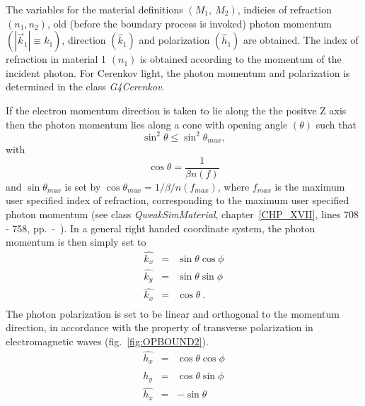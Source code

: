 The variables for the material definitions $(M_1,~M_2)$, indicies of
refraction $(n_1,n_2)$, old (before the boundary process is invoked)
photon momentum $(|\vec{k}_1| \equiv k_1)$, direction $(\hat{k}_1)$
and polarization $(\hat{h}_1)$ are obtained. The index of
refraction in material 1 $(n_1)$ is obtained according to the momentum
of the incident photon. For Cerenkov light, the photon momentum and
polarization is determined in the class {\em G4Cerenkov}.

If the electron momentum direction is taken to lie along the the
positve Z axis then the photon momentum lies along a cone with opening
angle $(\theta)$ such that $$\sin^2\theta \leq \sin^2\theta_{max},$$
with $$\cos\theta = \frac{1}{\beta n(f)}$$ and $\sin\theta_{max}$ is
set by $\cos\theta_{max} = 1/\beta/n(f_{max})$, where $f_{max}$ is the
maximum user specified index of refraction, corresponding to the
maximum user specified photon momentum (see class {\it
QweakSimMaterial}, chapter~\ref{CHP_XVII}, lines 708 - 758,
pp.~\pageref{SourceXVII12}-~\pageref{SourceXVII13}).  In a general
right handed coordinate system, the photon momentum is then simply set
to
\begin{eqnarray}
\hat{k_x} &=& \sin\theta\cos\phi \nonumber \\ 
\hat{k_y} &=& \sin\theta\sin\phi \nonumber \\ 
\hat{k_x} &=& \cos\theta~. \nonumber \\ \nonumber 
\end{eqnarray}
The photon polarization is set to be linear and orthogonal to the
momentum direction, in accordance with the property of transverse 
polarization in electromagnetic waves (fig.~\ref{fig:OPBOUND2}). 
\begin{eqnarray}
\hat{h_x} &=& \cos\theta\cos\phi \nonumber \\ 
\hat{h_y} &=& \cos\theta\sin\phi \nonumber \\ 
\hat{h_x} &=& -\sin\theta \nonumber \\ \nonumber 
\end{eqnarray}
